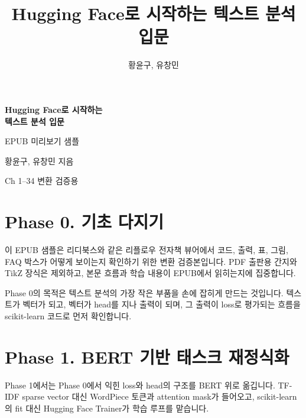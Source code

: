 \documentclass[11pt,oneside]{book}
\title{Hugging Face로 시작하는 텍스트 분석 입문}
\author{황윤구, 유창민}
\date{}
\begin{document}
\frontmatter

\begin{titlepage}
\centering
\vspace*{4em}
{\Huge\bfseries Hugging Face로 시작하는\\[0.25em]텍스트 분석 입문\par}
\vspace{1.5em}
{\Large EPUB 미리보기 샘플\par}
\vspace{2em}
{\large 황윤구, 유창민 지음\par}
\vfill
{\small Ch 1--34 변환 검증용\par}
\end{titlepage}

\tableofcontents

\mainmatter

\chapter*{Phase 0. 기초 다지기}

이 EPUB 샘플은 리디북스와 같은 리플로우 전자책 뷰어에서 코드, 출력, 표, 그림, FAQ 박스가 어떻게 보이는지 확인하기 위한 변환 검증본입니다. PDF 출판용 간지와 TikZ 장식은 제외하고, 본문 흐름과 학습 내용이 EPUB에서 읽히는지에 집중합니다.

Phase 0의 목적은 텍스트 분석의 가장 작은 부품을 손에 잡히게 만드는 것입니다. 텍스트가 벡터가 되고, 벡터가 head를 지나 출력이 되며, 그 출력이 loss로 평가되는 흐름을 scikit-learn 코드로 먼저 확인합니다.








\chapter*{Phase 1. BERT 기반 태스크 재정식화}

Phase 1에서는 Phase 0에서 익힌 loss와 head의 구조를 BERT 위로 옮깁니다. TF-IDF sparse vector 대신 WordPiece 토큰과 attention mask가 들어오고, scikit-learn의 fit 대신 Hugging Face Trainer가 학습 루프를 맡습니다.









\end{document}
